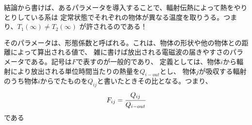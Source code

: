 \documentclass[C:\wrks\ODEof2ThermoRadiation\doc\ExaminationOfRadiationEff.tex]{subfiles}
\begin{document}
結論から書けば、あるパラメータを導入することで、輻射伝熱によって熱をやりとりしている系は
定常状態でそれぞれの物体が異なる温度を取りうる。つまり、$T_{1}(\infty) \neq T_{2}(\infty)$
が許されるのである！\par
そのパラメータは、形態係数と呼ばれる。これは、物体の形状や他の物体との距離によって算出される値で、
雑に書けば放出される電磁波の届きやすさのパラメータである。記号は$F$で表すのが一般的であり、
定義としては、物体$i$から輻射により放出される単位時間当たりの熱量を$Q_{i-out}$とし、
物体$j$が吸収する輻射のうち物体$i$からでたものを$Q_{ij}$と書いたときその比となる。つまり、
\begin{equation*}
  F_{ij} = \cfrac{Q_{ij}}{Q_{i-out}}
\end{equation*}
である
\end{document}
